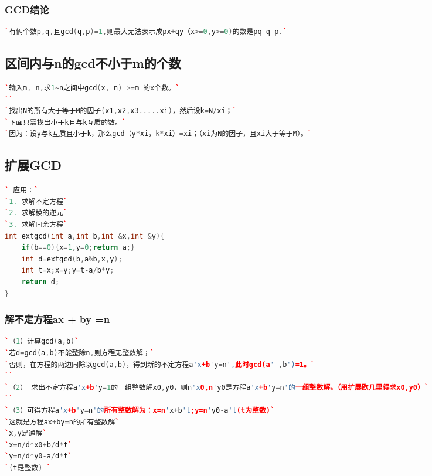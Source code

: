 \documentclass[a4paper]{article}
\begin{document}
\begin{CJK*}{UTF8}{gbsn}
\begin{multicols}{3}
\begin{flushleft}
\subsubsection{GCD结论}
\begin{lstlisting}[language={c++}]
`有俩个数p,q,且gcd(q,p)=1,则最大无法表示成px+qy（x>=0,y>=0)的数是pq-q-p.`
\end{lstlisting}




\subsection{区间内与n的gcd不小于m的个数 }
\begin{lstlisting}[language={c++}]
`输入m, n,求1~n之间中gcd(x, n) >=m 的x个数。`
``
`找出N的所有大于等于M的因子(x1,x2,x3.....xi)，然后设k=N/xi；`
`下面只需找出小于k且与k互质的数。`
`因为：设y与k互质且小于k，那么gcd（y*xi，k*xi）=xi；（xi为N的因子，且xi大于等于M）。`
\end{lstlisting}

\subsection{扩展GCD}
\begin{lstlisting}[language={c++}]
` 应用：`
`1. 求解不定方程`
`2. 求解模的逆元`
`3. 求解同余方程`
int extgcd(int a,int b,int &x,int &y){
	if(b==0){x=1,y=0;return a;}
	int d=extgcd(b,a%b,x,y);
	int t=x;x=y;y=t-a/b*y;
	return d;
}
\end{lstlisting}


\subsubsection{解不定方程ax + by =n}
\begin{lstlisting}[language={c++}]
`（1）计算gcd(a,b)`
`若d=gcd(a,b)不能整除n,则方程无整数解；`
`否则，在方程的两边同除以gcd(a,b)，得到新的不定方程a'x+b'y=n',此时gcd(a' ,b')=1。`
``
`（2） 求出不定方程a'x+b'y=1的一组整数解x0,y0，则n'x0,n'y0是方程a'x+b'y=n'的一组整数解。（用扩展欧几里得求x0,y0）`
``
`（3）可得方程a'x+b'y=n'的所有整数解为：x=n'x+b't;y=n'y0-a't(t为整数)`
`这就是方程ax+by=n的所有整数解`
`x,y是通解`
`x=n/d*x0+b/d*t`
`y=n/d*y0-a/d*t`
`(t是整数) `
\end{lstlisting}




\end{flushleft}
\end{multicols}
\end{CJK*}
\end{document}
